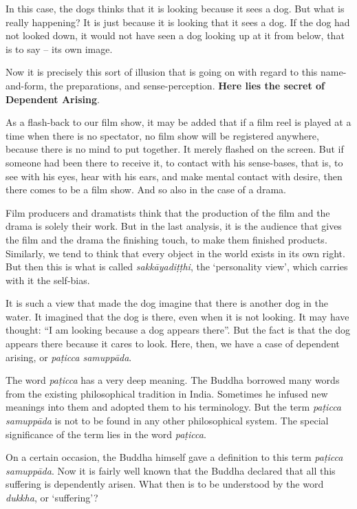 In this case, the dogs thinks that it is looking because it sees a dog. But what is really happening? It is just because it is looking that it sees a dog. If the dog had not looked down, it would not have seen a dog looking up at it from below, that is to say -- its own image.

Now it is precisely this sort of illusion that is going on with regard to this name-and-form, the preparations, and sense-perception. \textbf{Here lies the secret of Dependent Arising}.

As a flash-back to our film show, it may be added that if a film reel is played at a time when there is no spectator, no film show will be registered anywhere, because there is no mind to put together. It merely flashed on the screen. But if someone had been there to receive it, to contact with his sense-bases, that is, to see with his eyes, hear with his ears, and make mental contact with desire, then there comes to be a film show. And so also in the case of a drama.

Film producers and dramatists think that the production of the film and the drama is solely their work. But in the last analysis, it is the audience that gives the film and the drama the finishing touch, to make them finished products. Similarly, we tend to think that every object in the world exists in its own right. But then this is what is called \emph{sakkāyadiṭṭhi}, the `personality view', which carries with it the self-bias.

It is such a view that made the dog imagine that there is another dog in the water. It imagined that the dog is there, even when it is not looking. It may have thought: ``I am looking because a dog appears there''. But the fact is that the dog appears there because it cares to look. Here, then, we have a case of dependent arising, or \emph{paṭicca samuppāda}.

The word \emph{paṭicca} has a very deep meaning. The Buddha borrowed many words from the existing philosophical tradition in India. Sometimes he infused new meanings into them and adopted them to his terminology. But the term \emph{paṭicca samuppāda} is not to be found in any other philosophical system. The special significance of the term lies in the word \emph{paṭicca}.

On a certain occasion, the Buddha himself gave a definition to this term \emph{paṭicca samuppāda}. Now it is fairly well known that the Buddha declared that all this suffering is dependently arisen. What then is to be understood by the word \emph{dukkha}, or `suffering'?

